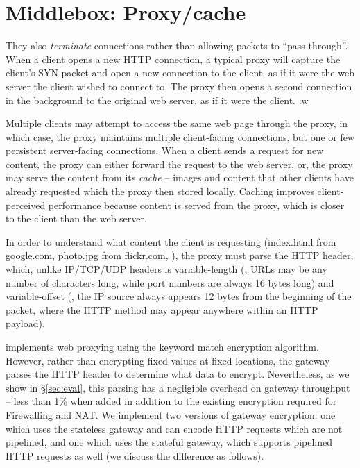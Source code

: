 \section{Middlebox: Proxy/cache}\label{s:proxy}
They also {\it terminate} connections rather than allowing packets to ``pass through''.
When a client opens a new HTTP connection, a typical proxy will capture the client's SYN packet and open a new connection to the client, as if it were the web server the client wished to connect to. 
The proxy then opens a second connection in the background to the original web server, as if it were the client. :w

Multiple clients may attempt to access the same web page through the proxy, in which case, the proxy maintains multiple client-facing connections, but one or few persistent server-facing connections.
When a client sends a request for new content, the proxy can either forward the request to the web server, or, the proxy may serve the content from its {\it cache} -- images and content that other clients have already requested which the proxy then stored locally. 
Caching improves client-perceived performance because content is served from the proxy, which is closer to the client than the web server.

In order to understand what content the client is requesting (index.html from google.com, photo.jpg from flickr.com, \etc{}), the proxy must parse the HTTP header, which, unlike IP/TCP/UDP headers is variable-length (\eg{}, URLs may be any number of characters long, while port numbers are always 16 bytes long) and variable-offset (\eg{}, the IP source always appears 12 bytes from the beginning of the packet, where the HTTP method may appear anywhere within an HTTP payload).

\sys implements web proxying using the keyword match encryption algorithm. 
However, rather than encrypting fixed values at fixed locations, the \sys gateway parses the HTTP header to determine what data to encrypt.
Nevertheless, as we show in \S\ref{sec:eval}, this parsing has a negligible overhead on gateway throughput -- less than 1\% when added in addition to the existing encryption required for Firewalling and NAT.
We implement two versions of gateway encryption: one which uses the stateless gateway and can encode HTTP requests which are not pipelined, and one which uses the stateful gateway, which supports pipelined HTTP requests as well (we discuss the difference as follows).


